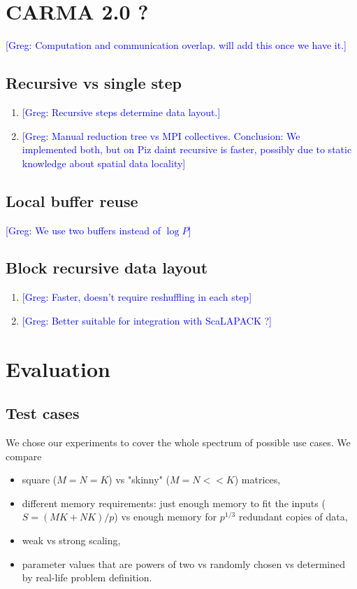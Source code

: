 \documentclass[sigplan,review,anonymous]{acmart}\settopmatter{printfolios=true,printccs=false,printacmref=false}
\newcommand\greg[1]{\textcolor{blue}{[Greg: #1]}}
\begin{document}
\section{CARMA 2.0 ?}
\label{sec:implementation}
 \greg{Computation and communication overlap. will add this once we have it.}
\subsection{Recursive vs single step}
\begin{enumerate}
	\item \greg{Recursive steps determine data layout.}
	\item \greg{Manual reduction tree vs MPI collectives. Conclusion: We 
	implemented both, but on Piz daint recursive is faster, possibly due to 
	static knowledge about spatial data locality}
\end{enumerate}
\subsection{Local buffer reuse}
\greg{We use two buffers instead of $\log P$}
\subsection{Block recursive data layout}
\begin{enumerate}
	\item \greg{Faster, doesn't require reshuffling in each step}
	\item \greg{Better suitable for integration with ScaLAPACK ?}
\end{enumerate}


\section{Evaluation}
\label{sec:evaluation}

\subsection{Test cases}
We chose our experiments to cover the whole spectrum of possible use cases. We 
compare
\begin{itemize}
	\item square ($M=N=K$) vs "skinny" ($M=N << K$) matrices,
	\item different memory requirements: just enough memory to fit the inputs 
	($S = (MK + NK)/p$) vs enough memory for $p^{1/3}$ redundant copies of data,
	\item weak vs strong scaling,
	\item parameter values that are powers of two vs randomly chosen vs 
	determined by real-life problem definition.
\end{itemize}
\end{document}
